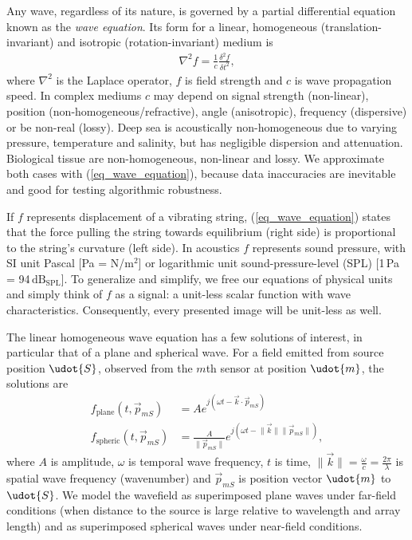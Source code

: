 {Any wave, regardless of its nature, is governed by a partial differential equation known as the \emph{wave equation}. Its form for a linear, homogeneous (translation-invariant) and isotropic (rotation-invariant) medium is
%
\begin{align}\label{eq_wave_equation}
\nabla^2 f 
 = \frac{1}{c}\frac{\delta^2 f}{\delta t^2},
\end{align}
%
where $\nabla^2$ is the Laplace operator, $f$ is field strength and $c$ is wave propagation speed. In complex mediums $c$ may depend on signal strength (non-linear), position (non-homogeneous/refractive), angle (anisotropic), frequency (dispersive) or be non-real (lossy). Deep sea is acoustically non-homogeneous due to varying pressure, temperature and salinity, but has negligible dispersion and attenuation. Biological tissue are non-homogeneous, non-linear and lossy. We approximate both cases with (\ref{eq_wave_equation}), because data inaccuracies are inevitable and good for testing algorithmic robustness.

If $f$ represents displacement of a vibrating string, (\ref{eq_wave_equation}) states that the force pulling the string towards equilibrium (right side) is proportional to the string's curvature (left side). In acoustics $f$ represents sound pressure, with SI unit Pascal [Pa = N/m$^2$] or logarithmic unit sound-pressure-level (SPL) [1\,Pa = 94\,$\mathrm{dB}_{\textrm{SPL}}$]. To generalize and simplify, we free our equations of physical units and simply think of $f$ as a signal: a unit-less scalar function with wave characteristics. Consequently, every presented image will be unit-less as well.

The linear homogeneous wave equation has a few solutions of interest, in particular that of a plane and spherical wave. For a field emitted from source position $\udot{S}$, observed from the $m$th sensor at position $\udot{m}$, the solutions are
%
\begin{align}
f_\textrm{plane}(t,\vec{p}_{mS})  &= A e^{j(\omega t - \vec{k} \cdot \vec{p}_{mS})} \\
f_\textrm{spheric}(t,\vec{p}_{mS}) &= \frac{A}{\lVert \vec{p}_{mS} \rVert} e^{j(\omega t - \lVert\vec{k}\rVert \lVert \vec{p}_{mS} \rVert)},
\end{align}
% 
where $A$ is amplitude, $\omega$ is temporal wave frequency, $t$ is time, $\lVert\vec{k}\rVert=\frac{\omega}{c}=\frac{2\pi}{\lambda}$ is spatial wave frequency (wavenumber) and $\vec{p}_{mS}$ is position vector $\udot{m}$ to $\udot{S}$. We model the wavefield as superimposed plane waves under far-field conditions (when distance to the source is large relative to wavelength and array length) and as superimposed spherical waves under near-field conditions. 

}
